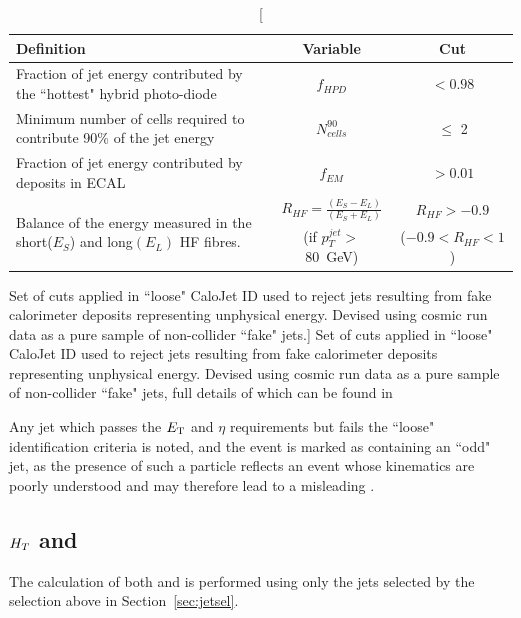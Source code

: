 \begin{table}[htbp]
\centering
\begin{tabular}{ m{6.6cm} c c }
\hline
\hline
 \centering Definition & Variable & Cut \\
\hline
\hline
 \centering Fraction of jet energy contributed by the ``hottest" hybrid photo-diode & $f_{HPD}$ & $< 0.98$ \\
 \centering Minimum number of cells required to contribute 90\% of the jet energy & $N^{90}_{cells}$ & $\leq$ 2 \\
 \centering Fraction of jet energy contributed by deposits in ECAL & $f_{EM}$ & $> 0.01$ \\
\multirow{2}{6.9cm}{Balance of the energy measured in the short($E_{S}$) and long$(E_{L})$ HF fibres.} & $R_{HF} = \frac{(E_{S} - E_{L})}{ (E_{S} + E_{L})}$ & $R_{HF} > - 0.9$\\
& (if $p_{T}^{jet}>$ 80~GeV) & ($-0.9 < R_{HF} < 1$)\\
\hline
\end{tabular}
\caption[Set of cuts applied in ``loose" CaloJet ID used to reject jets resulting from fake calorimeter deposits representing unphysical energy. Devised using cosmic run data as a pure sample of non-collider ``fake" jets.]{\label{tab:jetid} Set of cuts applied in ``loose" CaloJet ID used to reject jets resulting from fake calorimeter deposits representing unphysical energy. Devised using cosmic run data as a pure sample of non-collider ``fake" jets, full details of which can be found in \cite{JME-09-008}}
\end{table}


Any jet which passes the ${E_{\text T}}$ and $\eta$ requirements but fails the ``loose" identification criteria is noted, and the event is marked as containing an ``odd" jet, as the presence of such a particle reflects an event whose kinematics are poorly understood and may therefore lead to a misleading \MHT.
\subsection{$H_{T}$ and \MHT}
The calculation of both \HT and \MHT is performed using only the jets selected by the selection above in Section~\ref{sec:jetsel}.

